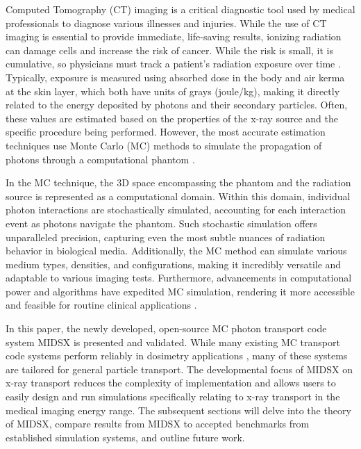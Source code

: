 \par Computed Tomography (CT) imaging is a critical diagnostic tool used by medical professionals to diagnose various illnesses and injuries. While the use of CT imaging is essential to provide immediate, life-saving results, ionizing radiation can damage cells and increase the risk of cancer. While the risk is small, it is cumulative, so physicians must track a patient's radiation exposure over time . Typically, exposure is measured using absorbed dose in the body and air kerma at the skin layer, which both have units of grays (joule/kg), making it directly related to the energy deposited by photons and their secondary particles. Often, these values are estimated based on the properties of the x-ray source and the specific procedure being performed. However, the most accurate estimation techniques use Monte Carlo (MC) methods to simulate the propagation of photons through a computational phantom \cite{essmedphys2012}. 
\par In the MC technique, the 3D space encompassing the phantom and the radiation source is represented as a computational domain. Within this domain, individual photon interactions are stochastically simulated, accounting for each interaction event as photons navigate the phantom. Such stochastic simulation offers unparalleled precision, capturing even the most subtle nuances of radiation behavior in biological media. Additionally, the MC method can simulate various medium types, densities, and configurations, making it incredibly versatile and adaptable to various imaging tests. Furthermore, advancements in computational power and algorithms have expedited MC simulation, rendering it more accessible and feasible for routine clinical applications \cite{fernandez_bosman_validation_2021}.
\par In this paper, the newly developed, open-source MC photon transport code system MIDSX is presented and validated. While many existing MC transport code systems perform reliably in dosimetry applications \cite{fernandez_bosman_validation_2021, geant4valid2004}, many of these systems are tailored for general particle transport. The developmental focus of MIDSX on x-ray transport reduces the complexity of implementation and allows users to easily design and run simulations specifically relating to x-ray transport in the medical imaging energy range. The subsequent sections will delve into the theory of MIDSX, compare results from MIDSX to accepted benchmarks from established simulation systems, and outline future work.

